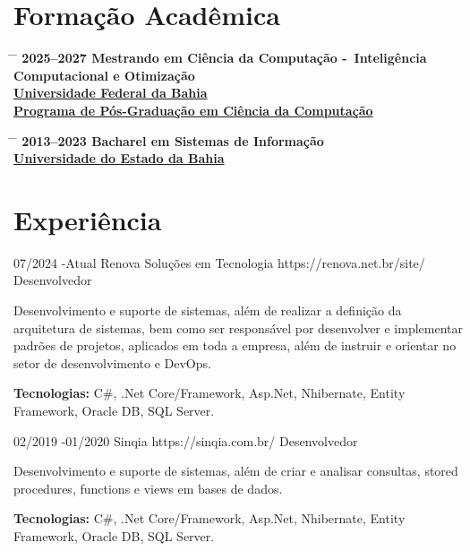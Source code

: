 \documentclass{article}
\begin{document}
\section*{Formação Acadêmica}

\begin{tabbing}
	\hspace{2cm} \= \hspace{4cm} \= \kill
	\bf{2025--2027} \> Mestrando em Ciência da Computação -\ Inteligência Computacional e Otimização \\
	\href{https://www.ufba.br/}{Universidade Federal da Bahia} \\
	\href{https://pgcomp.ufba.br/}{Programa de Pós-Graduação em Ciência da Computação} \\
\end{tabbing}

\begin{tabbing}
	\hspace{2cm} \= \hspace{4cm} \= \kill
	\bf{2013--2023} \> Bacharel em Sistemas de Informação \\
	\href{https://portal.uneb.br/}{Universidade do Estado da Bahia} \\
\end{tabbing}

\section*{Experiência}

\begin{job}
	{07/2024 -}{Atual}
	{Renova Soluções em Tecnologia}
	{https://renova.net.br/site/}
	{Desenvolvedor}%
	{Desenvolvimento e suporte de sistemas, além de realizar a definição da arquitetura de sistemas, bem como ser responsável por desenvolver e implementar padrões de projetos, aplicados em toda a empresa, além de instruir e orientar no setor de desenvolvimento e DevOps.
		\rule{0mm}{5mm}\textbf{Tecnologias:} C\#, {.Net}
		Core/Framework, Asp.Net, Nhibernate, Entity Framework, Oracle
		DB, SQL Server.}
\end{job}

\begin{job}
	{02/2019 -}{01/2020}
	{Sinqia}
	{https://sinqia.com.br/}
	{Desenvolvedor}%
	{Desenvolvimento e suporte de sistemas, além de criar e analisar consultas, stored procedures, functions e views em bases de dados.\\
		\rule{0mm}{5mm}\textbf{Tecnologias:} C\#, {.Net}
		Core/Framework, Asp.Net, Nhibernate, Entity Framework, Oracle
		DB, SQL Server.}
\end{job}
\end{document}
